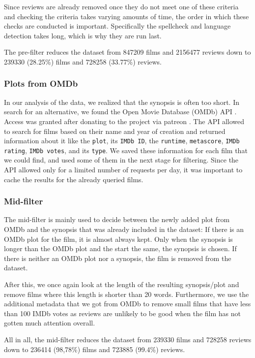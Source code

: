 Since reviews are already removed once they do not meet one of these criteria and checking the criteria takes varying amounts of time, the order in which these checks are conducted is important.
Specifically the spellcheck and language detection takes long, which is why they are run last.

The pre-filter reduces the dataset from 847209 films and 2156477 reviews down to 239330 (28.25\%) films and 728258 (33.77\%) reviews.


\subsubsection*{Plots from OMDb}
In our analysis of the data, we realized that the synopsis is often too short.
In search for an alternative, we found the Open Movie Database (OMDb) API \cite{omdb-api}.
Access was granted after donating to the project via patreon \cite{omdb-api-patreon}.
The API allowed to search for films based on their name and year of creation and returned information about it like the \texttt{plot}, its \texttt{IMDb ID}, the \texttt{runtime}, \texttt{metascore}, \texttt{IMDb rating}, \texttt{IMDb votes}, and its \texttt{type}.
We saved these information for each film that we could find, and used some of them in the next stage for filtering.
Since the API allowed only for a limited number of requests per day, it was important to cache the results for the already queried films.


\subsubsection*{Mid-filter}
The mid-filter is mainly used to decide between the newly added plot from OMDb and the synopsis that was already included in the dataset:
If there is an OMDb plot for the film, it is almost always kept.  
Only when the synopsis is longer than the OMDb plot and the start the same, the synopsis is chosen.
If there is neither an OMDb plot nor a synopsis, the film is removed from the dataset.

After this, we once again look at the length of the resulting synopsis/plot and remove films where this length is shorter than 20 words.
Furthermore, we use the additional metadata that we got from OMDb to remove small films that have less than 100 IMDb votes as reviews are unlikely to be good when the film has not gotten much attention overall. 

All in all, the mid-filter reduces the dataset from 239330 films and 728258 reviews down to 236414 (98,78\%) films and 723885 (99.4\%) reviews.


